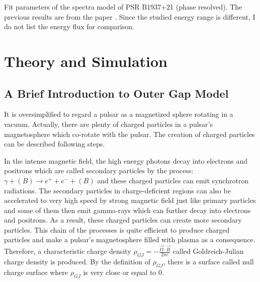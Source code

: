 \documentclass[12pt]{report}
\newcommand{\mycaption}[1]{\protect \caption{#1}}
\begin{document}
        \begin{table}[!htp]
          \centering
            \mycaption{Fit parameters of the spectra model of PSR B1937+21 (phase resolved). 
              The previous results are from the paper \citep{0004-637X-787-2-167}.
              Since the studied energy range is different, I do not list the energy flux for 
              comparison.}
            \label{table: j1939_fit_result}        
        \end{table} 

\chapter{Theory and Simulation}
  \section{A Brief Introduction to Outer Gap Model}
    It is oversimplified to regard a pulsar as a magnetized sphere rotating in a vacuum. 
    Actually, there are plenty of charged particles in a pulsar's magnetosphere 
    which co-rotate with the pulsar. The creation of charged particles can 
    be described following steps. \citep{Sturrock:1971zc}

    In the intense magnetic field, the high energy photons decay into electrons and 
    positrons which are called secondary particles by the process: 
    $\gamma + (B) \rightarrow e^++e^-+(B)$ and these charged particles can emit 
    synchrotron radiations. The secondary particles in charge-deficient regions can also 
    be accelerated to very high speed by strong magnetic field just like primary particles 
    and some of them then emit gamma-rays which can further decay into electrons and 
    positrons. As a result, these charged particles can create more secondary particles.
    This chain of the processes is quite efficient to produce charged particles and 
    make a pulsar's magnetosphere filled with plasma as a consequence. Therefore, a 
    characteristic charge density $\rho_{GJ}=-\frac{\vec{\Omega}\cdot \vec{B}}{2\pi c}$ 
    called Goldreich-Julian charge density is produced. \citep{1969ApJ}
    By the definition of $\rho_{GJ}$, there is a surface called null charge surface where 
    $\rho_{GJ}$ is very close or equal to $0$. 
\end{document}
